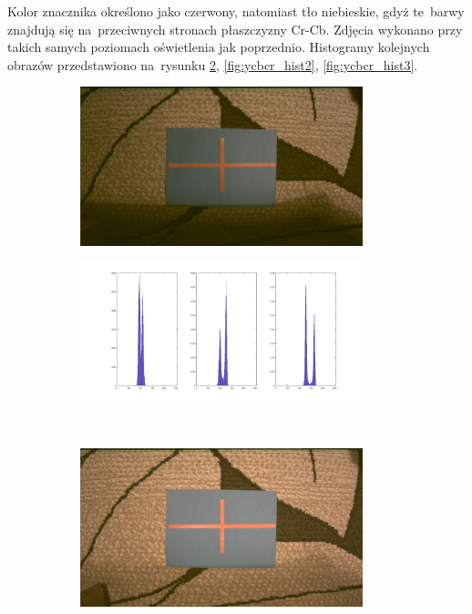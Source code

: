 Kolor znacznika określono jako czerwony, natomiast tło niebieskie, gdyż te~barwy znajdują się na~przeciwnych stronach płaszczyzny Cr-Cb. 
Zdjęcia wykonano przy takich samych poziomach oświetlenia jak poprzednio. 
Histogramy kolejnych obrazów przedstawiono na~rysunku \ref{fig:ycbcr_hist1}, \ref{fig:ycbcr_hist2}, \ref{fig:ycbcr_hist3}. 
\begin{figure}
	\centering
	\begin{subfigure}{0.45\textwidth}
		\centering
		\includegraphics[width=0.9\textwidth]{ycbcr_ciemny.jpg}
		\caption{}
		\label{fig:ycbcr_1}
	\end{subfigure}
	\begin{subfigure}{0.45\textwidth}
		\centering
		\includegraphics[width=0.9\textwidth]{ycbcr_hist1.jpg}
		\caption{}
		\label{fig:ycbcr_hist1}
	\end{subfigure}\\
	\begin{subfigure}{0.45\textwidth}
		\centering
		\includegraphics[width=0.9\textwidth]{ycbcr_sredni.jpg}

\end{subfigure}
\end{figure}
